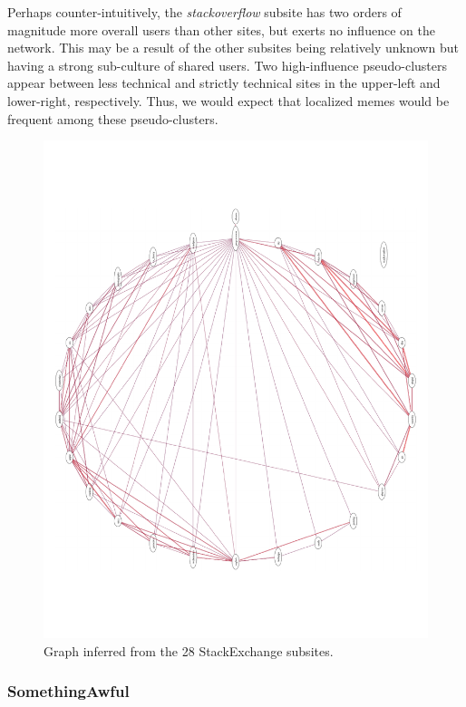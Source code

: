 \documentclass{article} %
\begin{document}
Perhaps counter-intuitively, the \textit{stackoverflow} subsite has two orders of magnitude more overall users than other sites, but exerts no influence on the network. This may be a result of the other subsites being relatively unknown but having a strong sub-culture of shared users. Two high-influence pseudo-clusters appear between less technical and strictly technical sites in the upper-left and lower-right, respectively. Thus, we would expect that localized memes would be frequent among these pseudo-clusters.

\begin{figure}[htb]
\centering
\includegraphics[width=\textwidth]{stackexchange.pdf}
\caption{Graph inferred from the 28 StackExchange subsites.}
\label{fig:stackexchange}
\end{figure}

\subsubsection{SomethingAwful}
\end{document}
